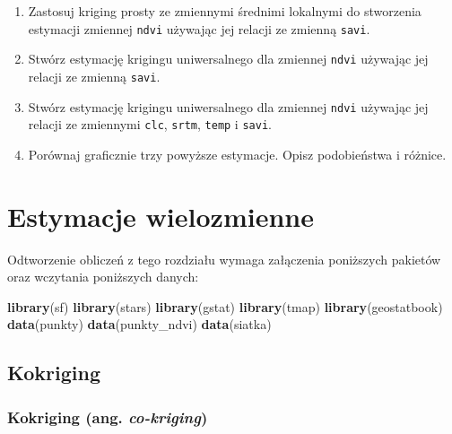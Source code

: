 \documentclass[
  paper=6in:9in,pagesize=pdftex,headinclude=on,footinclude=on,10pt]{scrbook}
\newenvironment{Shaded}{\begin{snugshade}}{\end{snugshade}}
\newcommand{\FunctionTok}[1]{\textcolor[rgb]{0.13,0.29,0.53}{\textbf{#1}}}
\newcommand{\NormalTok}[1]{#1}
\providecommand{\tightlist}{%
  \setlength{\itemsep}{0pt}\setlength{\parskip}{0pt}}
\begin{document}
\begin{enumerate}
\def\labelenumi{\arabic{enumi}.}
\tightlist
\item
  Zastosuj kriging prosty ze zmiennymi średnimi lokalnymi do stworzenia estymacji zmiennej \texttt{ndvi} używając jej relacji ze zmienną \texttt{savi}.
\item
  Stwórz estymację krigingu uniwersalnego dla zmiennej \texttt{ndvi} używając jej relacji ze zmienną \texttt{savi}.
\item
  Stwórz estymację krigingu uniwersalnego dla zmiennej \texttt{ndvi} używając jej relacji ze zmiennymi \texttt{clc}, \texttt{srtm}, \texttt{temp} i \texttt{savi}.
\item
  Porównaj graficznie trzy powyższe estymacje.
  Opisz podobieństwa i różnice.
\end{enumerate}

\chapter{Estymacje wielozmienne}\label{estymacje-wielozmienne}

Odtworzenie obliczeń z tego rozdziału wymaga załączenia poniższych pakietów oraz wczytania poniższych danych:

\begin{Shaded}
\begin{Highlighting}[]
\FunctionTok{library}\NormalTok{(sf)}
\FunctionTok{library}\NormalTok{(stars)}
\FunctionTok{library}\NormalTok{(gstat)}
\FunctionTok{library}\NormalTok{(tmap)}
\FunctionTok{library}\NormalTok{(geostatbook)}
\FunctionTok{data}\NormalTok{(punkty)}
\FunctionTok{data}\NormalTok{(punkty\_ndvi)}
\FunctionTok{data}\NormalTok{(siatka)}
\end{Highlighting}
\end{Shaded}

\section{Kokriging}\label{kokriging}

\subsection{\texorpdfstring{Kokriging (ang. \emph{co-kriging})}{Kokriging (ang. co-kriging)}}\label{kokriging-ang.-co-kriging}
\end{document}
